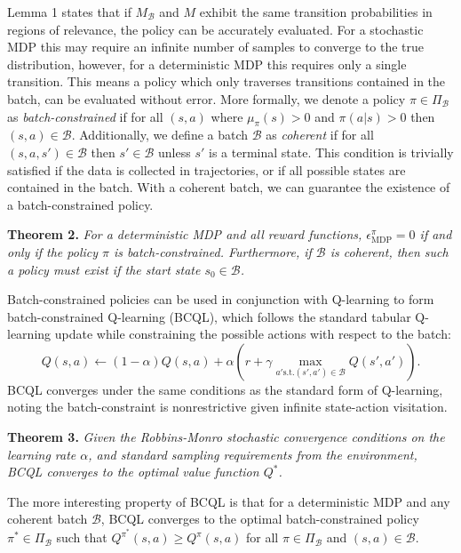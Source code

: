 \documentclass{article}
\newcommand{\e}{\epsilon}
\newcommand{\y}{\gamma}
\newcommand{\al}{\alpha}
\newcommand{\B}{\mathcal{B}}
\begin{document}
Lemma 1 states that if $M_\B$ and $M$ exhibit the same transition probabilities in regions of relevance, the policy can be accurately evaluated. For a stochastic MDP this may require an infinite number of samples to converge to the true distribution, however, for a deterministic MDP this requires only a single transition. 
This means a policy which only traverses transitions contained in the batch, can be evaluated without error. 
More formally, we denote a policy $\pi \in \Pi_\B$ as \textit{batch-constrained} if for all $(s,a)$ where $\mu_\pi(s) >0$ and $\pi(a|s) > 0$ then $(s,a) \in \B$. 
Additionally, we define a batch $\B$ as \textit{coherent} if for all $(s,a,s') \in \B$ then $s' \in \B$ unless $s'$ is a terminal state. This condition is trivially satisfied if the data is collected in trajectories, or if all possible states are contained in the batch. With a coherent batch, we can guarantee the existence of a batch-constrained policy. 

\textbf{Theorem 2.} \textit{For a deterministic MDP and all reward functions, $\e^\pi_{\text{MDP}} = 0$ if and only if the policy $\pi$ is batch-constrained. Furthermore, if $\B$ is coherent, then such a policy must exist if the start state $s_0 \in \B$.} 

Batch-constrained policies can be used in conjunction with Q-learning to form batch-constrained Q-learning (BCQL), which follows the standard tabular Q-learning update while constraining the possible actions with respect to the batch: 
\begin{equation}
Q(s,a) \leftarrow (1 - \al) Q(s,a) + \al (r + \y \max_{a' \text{s.t.} (s',a') \in \B} Q(s',a')).
\end{equation}
BCQL converges under the same conditions as the standard form of Q-learning, noting the batch-constraint is nonrestrictive given infinite state-action visitation. 

\textbf{Theorem 3.} \textit{Given the Robbins-Monro stochastic convergence conditions on the learning rate $\al$, and standard sampling requirements from the environment, BCQL converges to  the optimal value function $Q^*$.}

The more interesting property of BCQL is that for a deterministic MDP and any coherent batch $\B$, BCQL converges to the optimal batch-constrained policy $\pi^* \in \Pi_\B$ such that $Q^{\pi^*}(s,a) \geq Q^\pi(s,a)$ for all $\pi \in \Pi_\B$ and $(s,a) \in \B$. 
\end{document}
